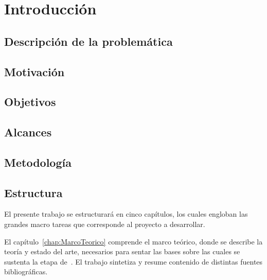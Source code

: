 
\chapter{Introducción}
\label{chap:introduction}

\section{Descripción de la problemática}


\section{Motivación}
\label{sec:motivation}


\section{Objetivos}
\label{sec:objectives}


\section{Alcances}
\label{sec:scope}


\section{Metodología}
\label{sec:methodology}


\section{Estructura}
\label{sec:structure}
El presente trabajo se estructurará en cinco capítulos, los cuales engloban las grandes macro tareas que corresponde al proyecto a desarrollar.

El capítulo~\ref{chap:MarcoTeorico} comprende el marco teórico, donde se describe la teoría y estado del arte, necesarios para sentar las bases sobre las cuales se sustenta la etapa de~. El trabajo sintetiza y resume contenido de distintas fuentes bibliográficas.

